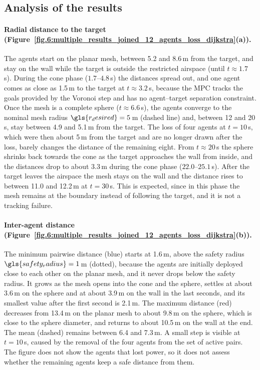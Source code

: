 \subsection{Analysis of the results}
\label{sec:6:results_analysis_loss}

\paragraph{Radial distance to the target (Figure~\ref{fig.6:multiple_results_joined_12_agents_loss_dijkstra}(a)).}
The agents start on the planar mesh, between 5.2 and 8.6\,m from the target, and stay on the wall while the target is outside the restricted airspace (until $t\approx1.7$\,s). During the cone phase ($1.7$--$4.8$\,s) the distances spread out, and one agent comes as close as 1.5\,m to the target at $t\approx3.2$\,s, because the MPC tracks the goals provided by the Voronoi step and has no agent--target separation constraint. Once the mesh is a complete sphere ($t\approx6.6$\,s), the agents converge to the nominal mesh radius $\gls{r_desired}=5$\,m (dashed line) and, between 12 and 20\,s, stay between 4.9 and 5.1\,m from the target. The loss of four agents at $t=10$\,s, which were then about 5\,m from the target and are no longer drawn after the loss, barely changes the distance of the remaining eight. From $t\approx20$\,s the sphere shrinks back towards the cone as the target approaches the wall from inside, and the distances drop to about 3.3\,m during the cone phase ($22.0$--$25.1$\,s). After the target leaves the airspace the mesh stays on the wall and the distance rises to between 11.0 and 12.2\,m at $t=30$\,s. This is expected, since in this phase the mesh remains at the boundary instead of following the target, and it is not a tracking failure.

\paragraph{Inter-agent distance (Figure~\ref{fig.6:multiple_results_joined_12_agents_loss_dijkstra}(b)).}
The minimum pairwise distance (blue) starts at 1.6\,m, above the safety radius $\gls{safety_radius}=1$\,m (dotted), because the agents are initially deployed close to each other on the planar mesh, and it never drops below the safety radius. It grows as the mesh opens into the cone and the sphere, settles at about 3.6\,m on the sphere and at about 3.9\,m on the wall in the last seconds, and its smallest value after the first second is 2.1\,m. The maximum distance (red) decreases from 13.4\,m on the planar mesh to about 9.8\,m on the sphere, which is close to the sphere diameter, and returns to about 10.5\,m on the wall at the end. The mean (dashed) remains between 6.4 and 7.3\,m. A small step is visible at $t=10$\,s, caused by the removal of the four agents from the set of active pairs. The figure does not show the agents that lost power, so it does not assess whether the remaining agents keep a safe distance from them.

